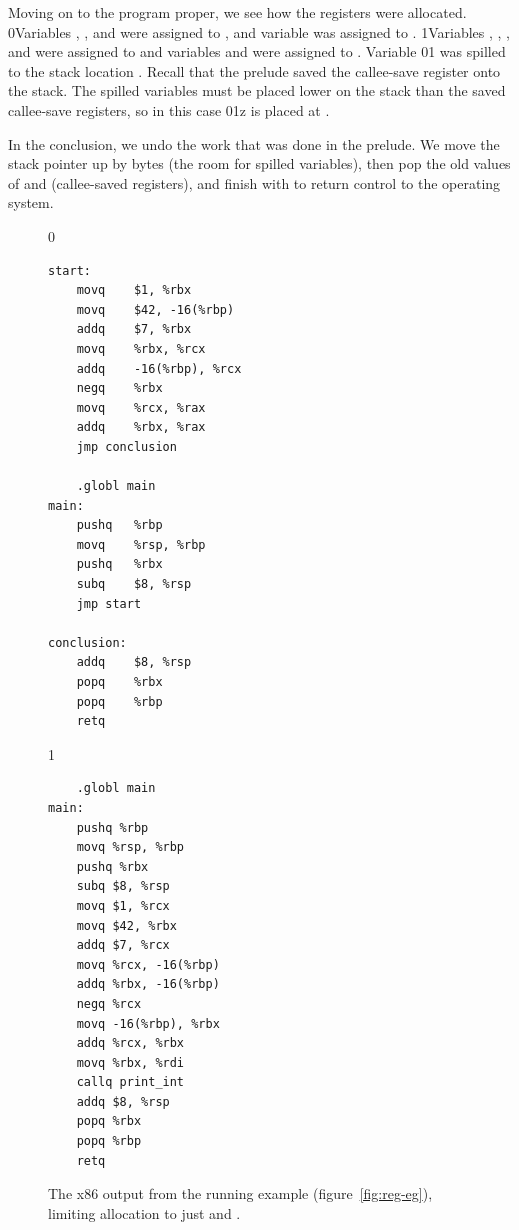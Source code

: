 \documentclass[7x10]{TimesAPriori_MIT}%
\def\racketEd{0}
\def\pythonEd{1}
\def\edition{0}
\newcommand{\racket}[1]{{\if\edition\racketEd{#1}\fi}}
\newcommand{\python}[1]{{\if\edition\pythonEd #1\fi}}
\numberwithin{theorem}{chapter}
\numberwithin{definition}{chapter}
\numberwithin{equation}{chapter}
\begin{document}
Moving on to the program proper, we see how the registers were
allocated.
%
\racket{Variables , , and  were assigned to
  , and variable \code{z} was assigned to .}
%
\python{Variables , , , and \code{tmp\_0}
  were assigned to \code{rcx} and variables \code{w} and \code{tmp\_1}
  were assigned to \code{rbx}.}
%
Variable \racket{}\python{} was spilled to the stack
location .  Recall that the prelude saved the
callee-save register  onto the stack. The spilled variables
must be placed lower on the stack than the saved callee-save
registers, so in this case \racket{}\python{z} is placed at
.

In the conclusion, we undo the work that was
done in the prelude. We move the stack pointer up by  bytes
(the room for spilled variables), then pop the old values of
 and  (callee-saved registers), and finish with
 to return control to the operating system.

  
\begin{figure}[tbp]
\begin{minipage}{0.55\textwidth}
\begin{tcolorbox}[colback=white]
{\if\edition\racketEd
\begin{lstlisting}
start:
	movq	$1, %rbx
	movq	$42, -16(%rbp)
	addq	$7, %rbx
	movq	%rbx, %rcx
	addq	-16(%rbp), %rcx
	negq	%rbx
	movq	%rcx, %rax
	addq	%rbx, %rax
	jmp conclusion

	.globl main
main:
	pushq	%rbp
	movq	%rsp, %rbp
	pushq	%rbx
	subq	$8, %rsp
	jmp start
        
conclusion:
	addq	$8, %rsp
	popq	%rbx
	popq	%rbp
	retq
\end{lstlisting}
\fi}
{\if\edition\pythonEd
\begin{lstlisting}
	.globl main
main:
	pushq %rbp
	movq %rsp, %rbp
	pushq %rbx
	subq $8, %rsp
	movq $1, %rcx
	movq $42, %rbx
	addq $7, %rcx
	movq %rcx, -16(%rbp)
	addq %rbx, -16(%rbp)
	negq %rcx
	movq -16(%rbp), %rbx
	addq %rcx, %rbx
	movq %rbx, %rdi
	callq print_int
	addq $8, %rsp
	popq %rbx
	popq %rbp
	retq
\end{lstlisting}
\fi}
\end{tcolorbox}
\end{minipage}
\caption{The x86 output from the running example
  (figure~\ref{fig:reg-eg}), limiting allocation to just 
  and .}
\label{fig:running-example-x86}
\end{figure}
\end{document}

